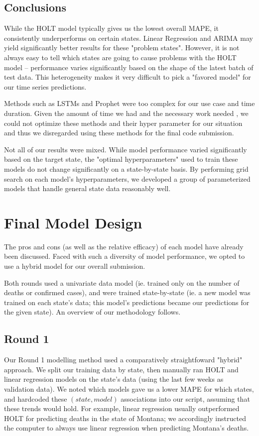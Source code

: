 \documentclass[sigconf,nonacm]{acmart}
\begin{document}
\subsection{Conclusions}

While the HOLT model typically gives us the lowest overall MAPE, it
consistently underperforms on certain states. Linear Regression and ARIMA may
yield significantly better results for these "problem states". However, it is
not always easy to tell which states are going to cause problems with the HOLT
model -- performance varies significantly based on the shape of the latest
batch of test data. This heterogeneity makes it very difficult to pick a
"favored model" for our time series predictions. 

Methods such as LSTMs and Prophet were too complex for our use case and
time duration. Given the amount of time we had and the necessary work needed 
, we could not optimize these methods and their hyper parameter for our
situation and thus we disregarded using these methods for the final code
submission.

Not all of our results were mixed. While model performance varied significantly
based on the target state, the "optimal hyperparameters" used to train these
models do not change significantly on a state-by-state basis. By performing
grid search on each model's hyperparameters, we developed a group of
parameterized models that handle general state data reasonably well. 


\section{Final Model Design}

The pros and cons (as well as the relative efficacy) of each model have already
been discussed. Faced with such a diversity of model performance, we opted to
use a hybrid model for our overall submission. 

Both rounds used a univariate data model (ie. trained only on the number of
deaths or confirmed cases), and were trained state-by-state (ie. a new model
was trained on each state's data; this model's predictions became our
predictions for the given state). An overview of our methodology follows. 

\subsection{Round 1}

Our Round 1 modelling method used a comparatively straightfoward "hybrid"
approach. We split our training data by state, then manually ran HOLT and
linear regression models on the state's data (using the last few weeks as
validation data). We noted which models gave us a lower MAPE for which states,
and hardcoded these $(state, model)$ associations into our script, assuming
that these trends would hold. For example, linear regression usually
outperformed HOLT for predicting deaths in the state of Montana; we accordingly
instructed the computer to always use linear regression when predicting
Montana's deaths. 
\end{document}
